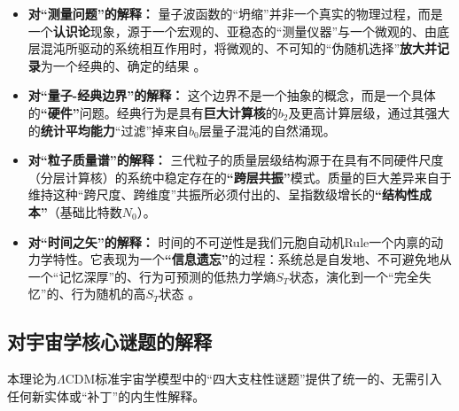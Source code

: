 \documentclass[11pt, a4paper]{article}
\begin{document}
\begin{itemize}
    \item \textbf{对“测量问题”的解释：}
    量子波函数的“坍缩”并非一个真实的物理过程，而是一个\textbf{认识论}现象，源于一个宏观的、亚稳态的“测量仪器”与一个微观的、由底层混沌所驱动的系统相互作用时，将微观的、不可知的“伪随机选择”\textbf{放大并记录}为一个经典的、确定的结果 \cite{deBroglie1930}。

    \item \textbf{对“量子-经典边界”的解释：}
    这个边界不是一个抽象的概念，而是一个具体的\textbf{“硬件”}问题。经典行为是具有\textbf{巨大计算核}的$b_2$及更高计算层级，通过其强大的\textbf{统计平均能力}“过滤”掉来自$b_0$层量子混沌的自然涌现。

    \item \textbf{对“粒子质量谱”的解释：}
    三代粒子的质量层级结构源于在具有不同硬件尺度（分层计算核）的系统中稳定存在的\textbf{“跨层共振”}模式。质量的巨大差异来自于维持这种“跨尺度、跨维度”共振所必须付出的、呈指数级增长的\textbf{“结构性成本”}（基础比特数$N_0$）。

    \item \textbf{对“时间之矢”的解释：}
    时间的不可逆性是我们元胞自动机Rule一个内禀的动力学特性。它表现为一个\textbf{“信息遗忘”}的过程：系统总是自发地、不可避免地从一个“记忆深厚”的、行为可预测的低热力学熵$S_T$状态，演化到一个“完全失忆”的、行为随机的高$S_T$状态 \cite{Kolmogorov1965}。
\end{itemize}

\subsection{对宇宙学核心谜题的解释}

本理论为$\Lambda$CDM标准宇宙学模型中的“四大支柱性谜题”提供了统一的、无需引入任何新实体或“补丁”的内生性解释。
\end{document}
